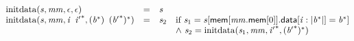 $$
\begin{array}{@{}lcl@{}l@{}}
{\mathrm{initdata}}({\mathit{s}}, {\mathit{mm}}, \epsilon, \epsilon) &=& {\mathit{s}} &  \\
{\mathrm{initdata}}({\mathit{s}}, {\mathit{mm}}, {\mathit{i}}~\,{{\mathit{i}'}^\ast}, ({{\mathit{b}}^\ast})~\,{({{\mathit{b}'}^\ast})^\ast}) &=& {\mathit{s}}_{{2}} &\quad
  \mbox{if}~{\mathit{s}}_{{1}} = {\mathit{s}}{}[\mathsf{mem}{}[{\mathit{mm}}.\mathsf{mem}{}[0]].\mathsf{data}{}[{\mathit{i}} : {|{{\mathit{b}}^\ast}|}] = {{\mathit{b}}^\ast}] \\
 &&&\quad {\land}~{\mathit{s}}_{{2}} = {\mathrm{initdata}}({\mathit{s}}_{{1}}, {\mathit{mm}}, {{\mathit{i}'}^\ast}, {({{\mathit{b}'}^\ast})^\ast}) \\
\end{array}
$$

